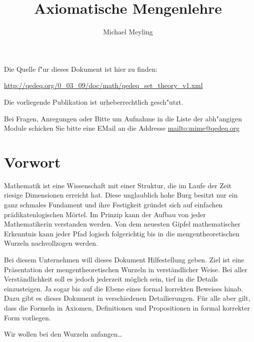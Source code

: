 \documentclass[a4paper,german,10pt,twoside]{book}
\title{Axiomatische Mengenlehre}
\author{
Michael Meyling
}
\theoremstyle{definition}
\theoremstyle{remark}
\begin{document}
\maketitle

\setlength{\parskip}{5pt plus 2pt minus 1pt}
\mbox{}
\vfill

\par
Die Quelle f{"ur} dieses Dokument ist hier zu finden:
\par
\url{http://qedeq.org/0_03_09/doc/math/qedeq_set_theory_v1.xml}

\par
Die vorliegende Publikation ist urheberrechtlich gesch{"u}tzt.
\par
Bei Fragen, Anregungen oder Bitte um Aufnahme in die Liste der abh{"a}ngigen Module schicken Sie bitte eine EMail an die Addresse \url{mailto:mime@qedeq.org}

\setlength{\parskip}{0pt}
\tableofcontents

\setlength{\parskip}{5pt plus 2pt minus 1pt}

\chapter*{Vorwort\label{ch:preface}} \label{chapter0} \hypertarget{chapter0}{}

Mathematik ist eine Wissenschaft mit einer Struktur, die im Laufe der Zeit riesige Dimensionen erreicht hat. Diese unglaublich hohe Burg besitzt nur ein ganz schmales Fundament und ihre Festigkeit gr{\"u}ndet sich auf einfachen pr{\"a}dikatenlogischen M{\"o}rtel. Im Prinzip kann der Aufbau von jeder Mathematikerin verstanden werden. Von dem neuesten Gipfel mathematischer Erkenntnis kann jeder Pfad logisch folgerichtig bis in die mengentheoretischen Wurzeln nachvollzogen werden.

\par
Bei diesem Unternehmen will dieses Dokument Hilfestellung geben. Ziel ist eine Pr{\"a}sentation der mengentheoretischen Wurzeln in verst{\"a}ndlicher Weise. Bei aller Verst{\"a}ndlichkeit soll es jedoch jederzeit m{\"o}glich sein, tief in die Details einzusteigen. Ja sogar bis auf die Ebene eines formal korrekten Beweises hinab. Dazu gibt es dieses Dokument in verschiedenen Detailierungen. F{\"u}r alle aber gilt, dass die Formeln in Axiomen, Definitionen und Propositionen in formal korrekter Form vorliegen.

\par
Wir wollen bei den Wurzeln anfangen\ldots
\end{document}
